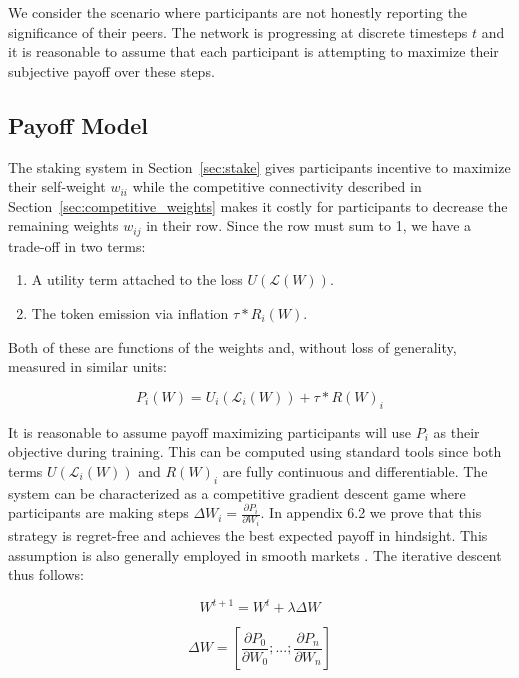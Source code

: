 \documentclass{article}
\begin{document}
We consider the scenario where participants are not honestly reporting the significance of their peers. The network is progressing at discrete timesteps $t$ and it is reasonable to assume that each participant is attempting to maximize their subjective payoff over these steps.

\subsection{Payoff Model}

The staking system in Section~\ref{sec:stake} gives participants incentive to maximize their self-weight $w_{ii}$ while the competitive connectivity described in Section~\ref{sec:competitive_weights} makes it costly for participants to decrease the remaining weights $w_{ij}$ in their row. Since the row must sum to 1, we have a trade-off in two terms:

\begin{enumerate}
	\item A utility term attached to the loss $U(\mathcal{L}(W))$.
	\item The token emission via inflation $\tau * R_i(W)$. 
\end{enumerate}

Both of these are functions of the weights and, without loss of generality, measured in similar units:
\bigskip

\begin{equation}
P_i (W) = U_i(\mathcal{L}_i(W)) + \tau * R(W)_i
\end{equation}
\smallskip

It is reasonable to assume payoff maximizing participants will use $P_i$ as their objective during training. This can be computed using standard tools since both terms $U(\mathcal{L}_i(W))$ and $R(W)_i$ are fully continuous and differentiable. The system can be characterized as a competitive gradient descent game where participants are making steps $\Delta W_i = \frac{\partial P_i}{\partial W_i}$. In appendix 6.2 we prove that this strategy is regret-free and achieves the best expected payoff in hindsight. This assumption is also generally employed in smooth markets \cite{balduzzi2020smooth}. The iterative descent thus follows:
\smallskip


\begin{equation}
W^{t+1} = W^{t} + \lambda \Delta W 
\end{equation}
\smallskip


\begin{equation}
\Delta W = [\frac{\partial P_0}{\partial W_0} ; ... ;\frac{\partial P_n}{\partial W_n}]
\end{equation}
\smallskip
\end{document}
